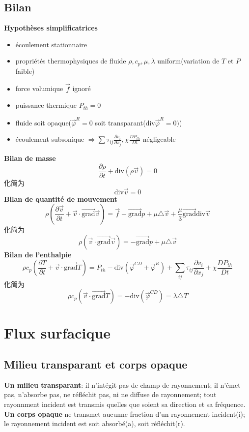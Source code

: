 \subsection{Bilan}
\textbf{Hypoth\`eses simplificatrices}
\begin{itemize}
\item \'ecoulement stationnaire
\item propri\'et\'es thermophysiques de fluide $\rho, c_p, \mu,\lambda $ uniform(variation de $T$ et $P$ faible)
\item force volumique $\vec{f}$ ignor\'e
\item puissance thermique $P_{th}=0$
\item fluide soit opaque($\vec{\varphi}^R = 0$ soit transparant($\mbox{div} \vec{\varphi}^R=0)$)
\item \'ecoulement subsonique $\Rightarrow \sum \tau_{ij}\frac{\partial  v_i}{\partial x_j},\chi\frac{ DP_{th}}{Dt}$ n\'egligeable
\end{itemize}
\textbf{Bilan de masse}
$$\frac{\partial  \rho}{\partial t} + \mbox{div} (\rho \vec{v})=0 $$
化简为
$$\mbox{div} \vec{v}=0$$
\textbf{Bilan de quantit\'e de mouvement}
$$
\rho(\frac{\partial  \vec{v}}{\partial t}+ \vec{v}\cdot \vec{\mbox{grad}}\vec{v}) =  \vec{f} - \vec{\mbox{grad}} p + \mu \triangle\vec{v} + \frac{\mu}{3}\vec{\mbox{grad}} \mbox{div} \vec{v}
$$
化简为
$$
\rho(  \vec{v}\cdot \vec{\mbox{grad}}\vec{v}) =   - \vec{\mbox{grad}} p + \mu \triangle\vec{v}
$$
\textbf{Bilan de l'enthalpie}
$$
\rho c_p (\frac{\partial  T}{\partial t} + \vec{v}\cdot \vec{\mbox{grad}} T)=P_{th} - \mbox{div} (\vec{\varphi}^{CD}+\vec{\varphi}^R) +  \sum_{ij} \tau_{ij}\frac{\partial  v_i}{\partial x_j} + \chi\frac{ DP_{th}}{Dt}
$$
化简为
$$
\rho c_p ( \vec{v}\cdot \vec{\mbox{grad}} T)=- \mbox{div} (\vec{\varphi}^{CD}) =\lambda \triangle T
$$


\section{Flux surfacique}
\subsection{Milieu transparant et corps opaque}
\textbf{Un milieu transparant}: il n'int\'egit pas de champ de rayonnement; il n'\'emet pas, n'absorbe pas, ne r\'efl\'echit pas, ni ne diffuse de rayonnement; tout rayonnment incident est transmis quelles que soient sa direction et sa fr\'equence.\\
\textbf{Un corps opaque} ne transmet aucunne fraction d'un rayonnement incident(i); le rayonnement incident est soit absorb\'e(a), soit r\'efl\'echit(r).
